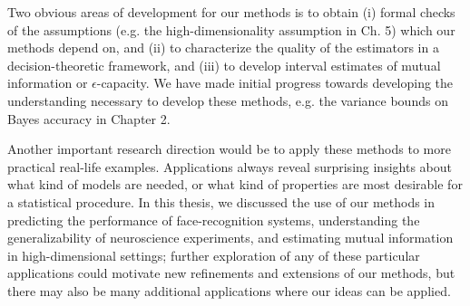 Two obvious areas of development for our methods is to obtain (i)
formal checks of the assumptions (e.g. the high-dimensionality
assumption in Ch. 5) which our methods depend on, and (ii) to
characterize the quality of the estimators in a decision-theoretic
framework, and (iii) to develop interval estimates of mutual
information or $\epsilon$-capacity.  We have made initial progress
towards developing the understanding necessary to develop these
methods, e.g. the variance bounds on Bayes accuracy in Chapter 2.

Another important research direction would be to apply these
methods to more practical real-life examples.  Applications always
reveal surprising insights about what kind of models are needed, or
what kind of properties are most desirable for a statistical
procedure.  In this thesis, we discussed the use of our methods in
predicting the performance of face-recognition systems, understanding
the generalizability of neuroscience experiments, and estimating
mutual information in high-dimensional settings; further exploration
of any of these particular applications could motivate new refinements
and extensions of our methods, but there may also be many additional
applications where our ideas can be applied.

